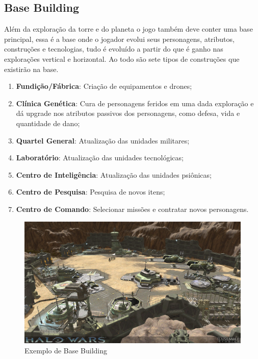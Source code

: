 \documentclass[11pt]{article} %
\begin{document}
\subsection{Base Building}
Além da exploração da torre e do planeta o jogo também deve conter uma base principal, essa é a base onde o jogador evolui seus personagens, atributos, construções e tecnologias, tudo é evoluído a partir do que é ganho nas explorações vertical e horizontal. Ao todo são sete tipos de construções que existirão na base.

\begin{enumerate}
  \item \textbf{Fundição/Fábrica}: Criação de equipamentos e drones;
  \item \textbf{Clínica Genética}: Cura de personagens feridos em uma dada exploração e dá upgrade nos atributos passivos dos personagens, como defesa, vida e quantidade de dano;
  \item \textbf{Quartel General}: Atualização das unidades militares;
  \item \textbf{Laboratório}: Atualização das unidades tecnológicas;
  \item \textbf{Centro de Inteligência}: Atualização das unidades psiônicas;
  \item \textbf{Centro de Pesquisa}: Pesquisa de novos itens;
  \item \textbf{Centro de Comando}: Selecionar missões e contratar novos personagens.
\end{enumerate}
\newpage

\begin{figure}[!htp]
\centering
\includegraphics[scale=0.3]{res/base_building.png}
\caption{Exemplo de Base Building}
\label{Exemplo de Base Building}
\end{figure}
\end{document}
